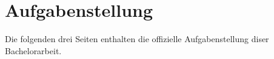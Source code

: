 \chapter{Aufgabenstellung}
\label{sec:aufgabenstellung}
Die folgenden drei Seiten enthalten die offizielle Aufgabenstellung diser Bachelorarbeit.

